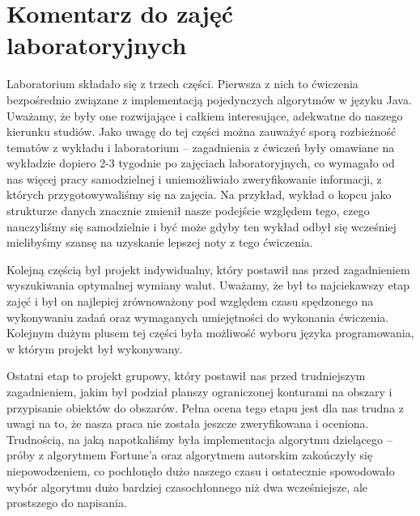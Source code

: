 \documentclass[a4paper,12pt]{article}
\newcommand\tab[1][0.6cm]{\hspace*{#1}}
\begin{document}
\section{Komentarz do zajęć laboratoryjnych}

\tab Laboratorium składało się z trzech części. Pierwsza z nich to ćwiczenia bezpośrednio związane z implementacją pojedynczych algorytmów w języku Java. Uważamy, że były one rozwijające i całkiem interesujące, adekwatne do naszego kierunku studiów. Jako uwagę do tej części można zauważyć sporą rozbieżność tematów z wykładu i laboratorium -- zagadnienia z ćwiczeń były omawiane na wykładzie dopiero 2-3 tygodnie po zajęciach laboratoryjnych, co wymagało od nas więcej pracy samodzielnej i uniemożliwiało zweryfikowanie informacji, z których przygotowywaliśmy się na zajęcia. Na przykład, wykład o kopcu jako strukturze danych znacznie zmienił nasze podejście względem tego, czego nauczyliśmy się samodzielnie i być może gdyby ten wykład odbył się wcześniej mielibyśmy szansę na uzyskanie lepszej noty z tego ćwiczenia.

Kolejną częścią był projekt indywidualny, który postawił nas przed zagadnieniem wyszukiwania optymalnej wymiany walut. Uważamy, że był to najciekawszy etap zajęć i był on najlepiej zrównoważony pod względem czasu spędzonego na wykonywaniu zadań oraz wymaganych umiejętności do wykonania ćwiczenia. Kolejnym dużym plusem tej części była możliwość wyboru języka programowania, w którym projekt był wykonywany.

Ostatni etap to projekt grupowy, który postawił nas przed trudniejszym zagadnieniem, jakim był podział planszy ograniczonej konturami na obszary i przypisanie obiektów do obszarów. Pełna ocena tego etapu jest dla nas trudna z uwagi na to, że nasza praca nie została jeszcze zweryfikowana i oceniona. Trudnością, na jaką napotkaliśmy była implementacja algorytmu dzielącego -- próby z algorytmem Fortune'a oraz algorytmem autorskim zakończyły się niepowodzeniem, co pochłonęło dużo naszego czasu i ostatecznie spowodowało wybór algorytmu dużo bardziej czasochłonnego niż dwa wcześniejsze, ale prostszego do napisania.
\end{document}
